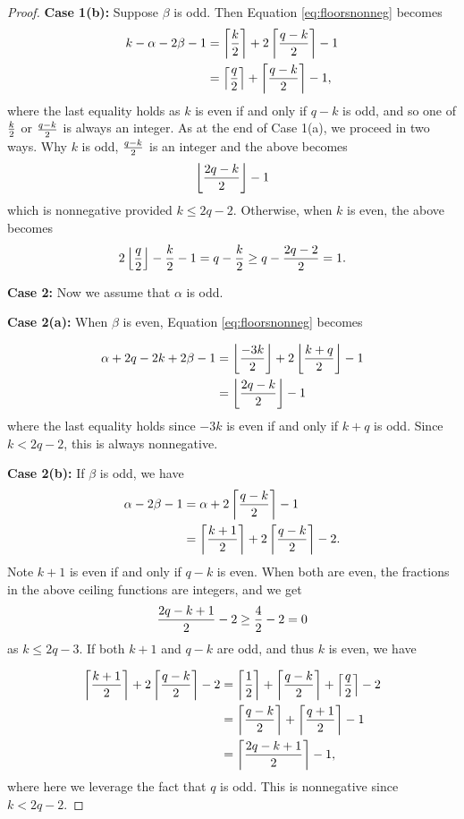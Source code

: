 \documentclass[11pt]{amsart}
\numberwithin{equation}{section}
\theoremstyle{plain}
\theoremstyle{definition}
\begin{document}
\begin{proof}
\noindent\textbf{Case 1(b):} Suppose $\beta$ is odd. Then Equation \ref{eq:floorsnonneg} becomes
\begin{align*}
k-\alpha -2\beta-1&=\left\lceil {k\over 2}\right\rceil+2\left\lceil{q-k\over 2}\right\rceil-1\\
&= \left\lceil {q\over 2}\right\rceil+\left\lceil{q-k\over 2}\right\rceil-1,
\end{align*}
where the last equality holds as $k$ is even if and only if $q-k$ is odd, and so one of ${k\over 2}$ or $q-k\over 2$ is always an integer. As at the end of Case 1(a), we proceed in two ways. Why $k$ is odd, ${q-k\over 2}$ is an integer and the above becomes
\[\left\lfloor{2q-k\over 2}\right\rfloor -1\]
which is nonnegative provided $k\leq 2q-2$. Otherwise, when $k$ is even, the above becomes
\[2\left\lfloor{q\over 2}\right\rfloor -{k\over 2}-1=q-{k\over 2}\geq q-{2q-2\over 2}=1.\]

\noindent \textbf{Case 2:} Now we assume that $\alpha$ is odd. 

\noindent\textbf{Case 2(a):}
When $\beta$ is even, Equation \ref{eq:floorsnonneg} becomes

\begin{align*}
\alpha+2q-2k+2\beta-1
&=\left\lfloor{-3k\over 2}\right\rfloor +2\left\lfloor {k+q\over 2}\right\rfloor-1\\
&=\left\lfloor{2q-k\over 2}\right\rfloor-1
\end{align*}
where the last equality holds since $-3k$ is even if and only if $k+q$ is odd. Since $k<2q-2$, this is always nonnegative. 

\noindent \textbf{Case 2(b):} If $\beta$ is odd, we have 
\begin{align*}
\alpha-2\beta-1&=\alpha+2\left\lceil {q-k\over 2}\right\rceil -1\\
&=\left\lceil{k+1\over 2}\right\rceil+2\left\lceil {q-k\over 2}\right\rceil -2.
\end{align*}
Note $k+1$ is even if and only if $q-k$ is even. When both are even, the fractions in the above ceiling functions are integers, and we get
\[{2q-k+1\over 2}-2\geq {4\over 2}-2=0\]
as $k\leq 2q-3$. If both $k+1$ and $q-k$ are odd, and thus $k$ is even, we have



\begin{align*}
\left\lceil{k+1\over 2}\right\rceil+2\left\lceil {q-k\over 2}\right\rceil -2&=\left\lceil {1\over 2}\right\rceil+\left\lceil {q-k\over 2}\right \rceil+\left\lceil {q\over 2}\right \rceil-2\\
&=\left\lceil {q-k\over 2}\right \rceil+\left\lceil{q+1\over 2}\right\rceil -1\\
&=\left\lceil {2q-k+1\over 2}\right \rceil -1,
\end{align*}
where here we leverage the fact that $q$ is odd. This is nonnegative since $k<2q-2$.



\end{proof}




\end{document}
